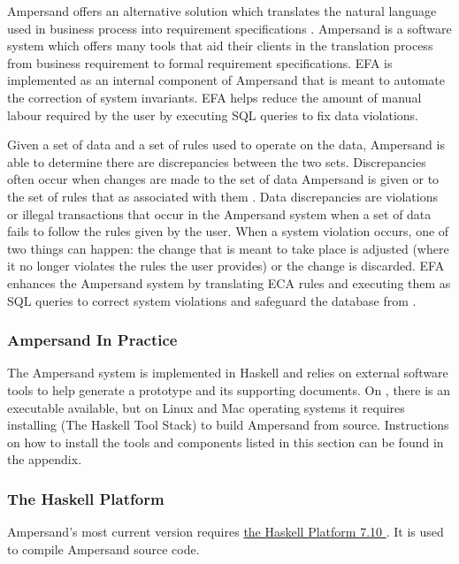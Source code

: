 \documentclass[journal,12pt,onecolumn,draftclsnofoot]{article}
\let\Oldsubsubsection\subsubsection
\renewcommand{\subsubsection}{\FloatBarrier\Oldsubsubsection}
\begin{document}
Ampersand offers an alternative solution which translates the natural language 
used in business process into requirement specifications
\cite{ruledesign}. 
Ampersand is a 
software system which offers many tools that aid their clients in the 
translation process from business requirement to formal requirement 
specifications. EFA is implemented as an internal component of Ampersand that 
is meant to automate the correction of system invariants. EFA helps reduce the 
amount of manual labour required by the user by executing SQL queries to fix 
data violations. %

Given a set of data and a set of rules used to operate on the data, Ampersand 
is able to determine  there are discrepancies between the two sets. 
Discrepancies often occur when changes are made to the set of data Ampersand is 
given or to the set of rules that as associated with them
.
Data discrepancies are violations or illegal transactions
that occur in the Ampersand system
when a set of data fails to follow the rules given by the user.
When a system violation occurs,
one of two things can happen: the change that is meant to 
take place is adjusted (where it no longer violates the rules the user 
provides) or the change is discarded. EFA enhances the Ampersand system by 
translating ECA rules and executing them as SQL queries to correct system 
violations and safeguard the database from .

\subsubsection{Ampersand In Practice}

The Ampersand system is implemented in Haskell and relies on external software 
tools to help generate a prototype and its supporting documents.
On , 
there is an executable available, but on Linux and Mac operating systems it 
requires installing  (The Haskell Tool Stack)
to build Ampersand from source. 
Instructions on how to install the tools and components listed in this section 
can be found in the appendix.

\subsubsection*{The Haskell Platform}
\noindent
Ampersand's most current version requires 
\href{https://www.haskell.org/platform/}{the Haskell Platform 7.10 }.
It is used to compile Ampersand source code.
\end{document}
